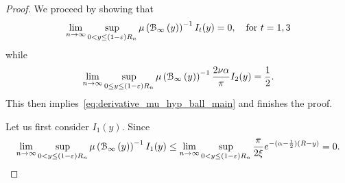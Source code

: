 \begin{proof}
We proceed by showing that
\begin{equation}\label{eq:derivative_hyp_ball_error_1}
	\lim_{n \to \infty} \sup_{0 < y \le (1-\varepsilon)R_n} \mu\left({\mathcal B}_{\infty}\left(y\right)\right)^{-1} I_t(y) = 0, \quad \text{for } t = 1,3
\end{equation}
while
\begin{equation}\label{eq:derivative_hyp_ball_main_part}
	\lim_{n \to \infty} \sup_{0 \le y \le (1-\varepsilon)R_n} \mu\left({\mathcal B}_{\infty}\left(y\right)\right)^{-1} \frac{2\nu \alpha}{\pi} I_2(y) = \frac{1}{2}.
\end{equation}
This then implies~\eqref{eq:derivative_mu_hyp_ball_main} and finishes the proof.

Let us first consider $I_1(y)$. Since 
\[
	\lim_{n \to \infty} \sup_{0 < y \le (1-\varepsilon)R_n} \mu\left({\mathcal B}_{\infty}\left(y\right)\right)^{-1} I_1(y) 
	\le \lim_{n \to \infty} \sup_{0 < y \le (1-\varepsilon)R_n} \frac{\pi}{2\xi} e^{-(\alpha - \frac{1}{2})(R - y)} = 0.
\]


\end{proof}
